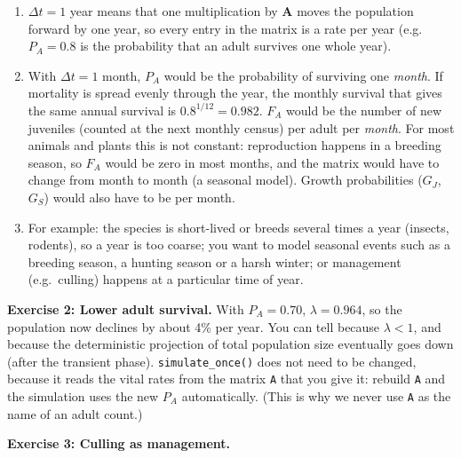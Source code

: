 \documentclass[
  a4paper]{book}
\providecommand{\tightlist}{%
  \setlength{\itemsep}{0pt}\setlength{\parskip}{0pt}}
\begin{document}
\begin{enumerate}
\def\labelenumi{\arabic{enumi}.}
\tightlist
\item
  \(\Delta t = 1\) year means that one multiplication by \(\mathbf{A}\) moves the population forward by one year, so every entry in the matrix is a rate per year (e.g.~\(P_A = 0.8\) is the probability that an adult survives one whole year).
\item
  With \(\Delta t = 1\) month, \(P_A\) would be the probability of surviving one \emph{month}. If mortality is spread evenly through the year, the monthly survival that gives the same annual survival is \(0.8^{1/12} = 0.982\). \(F_A\) would be the number of new juveniles (counted at the next monthly census) per adult per \emph{month}. For most animals and plants this is not constant: reproduction happens in a breeding season, so \(F_A\) would be zero in most months, and the matrix would have to change from month to month (a seasonal model). Growth probabilities (\(G_J\), \(G_S\)) would also have to be per month.
\item
  For example: the species is short-lived or breeds several times a year (insects, rodents), so a year is too coarse; you want to model seasonal events such as a breeding season, a hunting season or a harsh winter; or management (e.g.~culling) happens at a particular time of year.
\end{enumerate}

\textbf{Exercise 2: Lower adult survival.} With \(P_A = 0.70\), \(\lambda = 0.964\), so the population now declines by about 4\% per year. You can tell because \(\lambda < 1\), and because the deterministic projection of total population size eventually goes down (after the transient phase). \texttt{simulate\_once()} does not need to be changed, because it reads the vital rates from the matrix \texttt{A} that you give it: rebuild \texttt{A} and the simulation uses the new \(P_A\) automatically. (This is why we never use \texttt{A} as the name of an adult count.)

\textbf{Exercise 3: Culling as management.}
\end{document}
